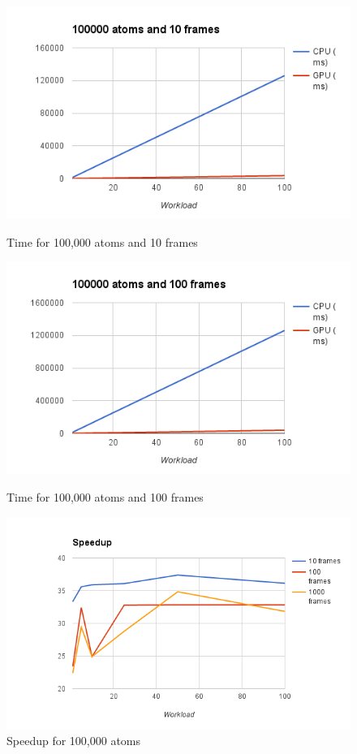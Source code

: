 \documentclass[12pt,letterpaper]{report}
\begin{document}
\begin{figure}[!tbp]
  \centering
  \begin{minipage}[b]{0.4\textwidth}
    \includegraphics[width=\textwidth]{images/exp_100000_10}
    \caption{Time for 100,000 atoms and 10 frames}
    \label{fg:exp_100000_10}
  \end{minipage}
  \hfill
  \begin{minipage}[b]{0.4\textwidth}
    \includegraphics[width=\textwidth]{images/exp_100000_100}
    \caption{Time for 100,000 atoms and 100 frames}
     \label{fg:exp_100000_100}
  \end{minipage}
  \hfill
  \begin{minipage}[b]{0.4\textwidth}
    \includegraphics[width=\textwidth]{images/speedup_100000}
    \caption{Speedup for 100,000 atoms}
     \label{fg:speedup_100000}
  \end{minipage}
\end{figure}
\end{document}
